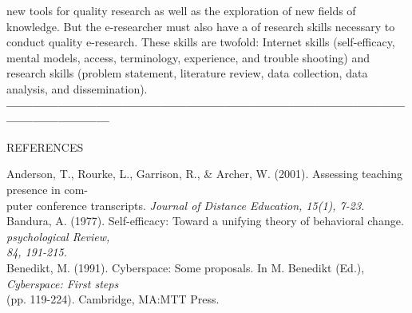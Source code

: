\documentclass{book}
\begin{document}
\vspace*{0.5cm}
 new tools for quality research as well as the exploration of new fields of knowledge. But the e-researcher must also have a of research skills necessary to conduct quality e-research. These skills are twofold: Internet skills (self-efficacy, mental models, access, terminology, experience, and trouble shooting) and research skills (problem statement, literature review, data collection, data analysis, and dissemination).\\

 \vspace*{0.6cm}
 \textbf{---------------------------------------------------------------------------------------------------------------------}\\
\large{REFERENCES

}

\vspace*{0.1cm}
Anderson, T., Rourke, L., Garrison, R., \& Archer, W. (2001). Assessing teaching presence in com-\\
\hspace*{0.4cm} puter conference transcripts. \emph{Journal of Distance Education, 15(1), 7-23.}\\
Bandura, A. (1977). Self-efficacy: Toward a unifying theory of behavioral change. \emph{psychological Review, \\
\hspace*{0.4cm} 84, 191-215.}\\
Benedikt, M. (1991). Cyberspace: Some proposals. In M. Benedikt (Ed.), \emph{Cyberspace: First steps }\\
\hspace*{0.4cm} (pp. 119-224). Cambridge, MA:MTT Press.\\
\end{document}
